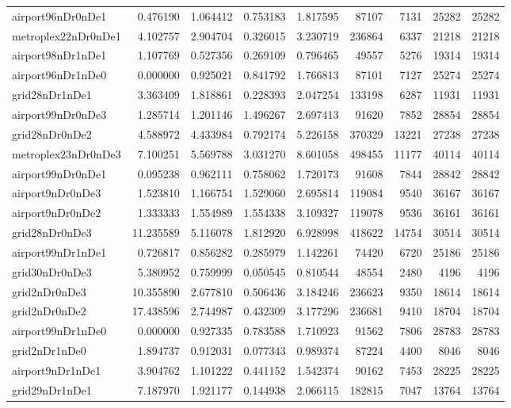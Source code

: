 \begin{longtable}{|l|r|r|r|r|r|r|r|r|}
airport96nDr0nDe1 & 0.476190 & 1.064412 & 0.753183 & 1.817595 & 87107 & 7131 & 25282 & 25282 \\
metroplex22nDr0nDe1 & 4.102757 & 2.904704 & 0.326015 & 3.230719 & 236864 & 6337 & 21218 & 21218 \\
airport98nDr1nDe1 & 1.107769 & 0.527356 & 0.269109 & 0.796465 & 49557 & 5276 & 19314 & 19314 \\
airport96nDr1nDe0 & 0.000000 & 0.925021 & 0.841792 & 1.766813 & 87101 & 7127 & 25274 & 25274 \\
grid28nDr1nDe1 & 3.363409 & 1.818861 & 0.228393 & 2.047254 & 133198 & 6287 & 11931 & 11931 \\
airport99nDr0nDe3 & 1.285714 & 1.201146 & 1.496267 & 2.697413 & 91620 & 7852 & 28854 & 28854 \\
grid28nDr0nDe2 & 4.588972 & 4.433984 & 0.792174 & 5.226158 & 370329 & 13221 & 27238 & 27238 \\
metroplex23nDr0nDe3 & 7.100251 & 5.569788 & 3.031270 & 8.601058 & 498455 & 11177 & 40114 & 40114 \\
airport99nDr0nDe1 & 0.095238 & 0.962111 & 0.758062 & 1.720173 & 91608 & 7844 & 28842 & 28842 \\
airport9nDr0nDe3 & 1.523810 & 1.166754 & 1.529060 & 2.695814 & 119084 & 9540 & 36167 & 36167 \\
airport9nDr0nDe2 & 1.333333 & 1.554989 & 1.554338 & 3.109327 & 119078 & 9536 & 36161 & 36161 \\
grid28nDr0nDe3 & 11.235589 & 5.116078 & 1.812920 & 6.928998 & 418622 & 14754 & 30514 & 30514 \\
airport99nDr1nDe1 & 0.726817 & 0.856282 & 0.285979 & 1.142261 & 74420 & 6720 & 25186 & 25186 \\
grid30nDr0nDe3 & 5.380952 & 0.759999 & 0.050545 & 0.810544 & 48554 & 2480 & 4196 & 4196 \\
grid2nDr0nDe3 & 10.355890 & 2.677810 & 0.506436 & 3.184246 & 236623 & 9350 & 18614 & 18614 \\
grid2nDr0nDe2 & 17.438596 & 2.744987 & 0.432309 & 3.177296 & 236681 & 9410 & 18704 & 18704 \\
airport99nDr1nDe0 & 0.000000 & 0.927335 & 0.783588 & 1.710923 & 91562 & 7806 & 28783 & 28783 \\
grid2nDr1nDe0 & 1.894737 & 0.912031 & 0.077343 & 0.989374 & 87224 & 4400 & 8046 & 8046 \\
airport9nDr1nDe1 & 3.904762 & 1.101222 & 0.441152 & 1.542374 & 90162 & 7453 & 28225 & 28225 \\
grid29nDr1nDe1 & 7.187970 & 1.921177 & 0.144938 & 2.066115 & 182815 & 7047 & 13764 & 13764 \\

\end{longtable}
